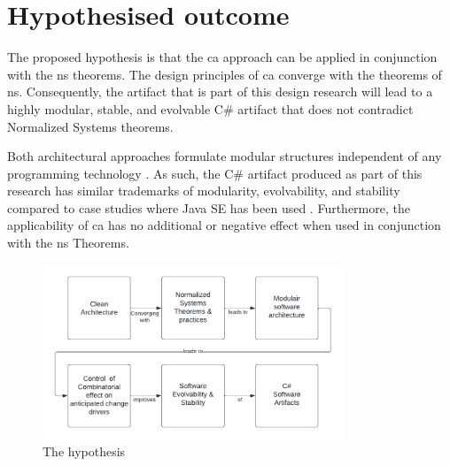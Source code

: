 \section{Hypothesised outcome} \label{hypothesis} 

The proposed hypothesis is that the \gls{ca} approach can be applied in conjunction with
the \gls{ns} theorems. The design principles of \gls{ca} converge with the theorems of
\gls{ns}. Consequently, the artifact that is part of this design research will lead to a
highly modular, stable, and evolvable C\# artifact that does not contradict Normalized
Systems theorems.

Both architectural approaches formulate modular structures independent of any programming
technology \parencite{mannaert_normalized_2009,robert_c_martin_clean_2018}. As such, the
C\# artifact produced as part of this research has similar trademarks of modularity,
evolvability, and stability compared to case studies where Java SE has been used
\parencite{oorts_building_2014, de_bruyn_enabling_2018}. Furthermore, the applicability of
\gls{ca} has no additional or negative effect when used in conjunction with the
\gls{ns} Theorems.

\begin{figure}[H]
    \centering
    \includegraphics[width=0.8\textwidth]{Figures/hypothesis.pdf}
    \caption[The hypothesis]{The hypothesis}
    \label{fig_hypothesis}
\end{figure}